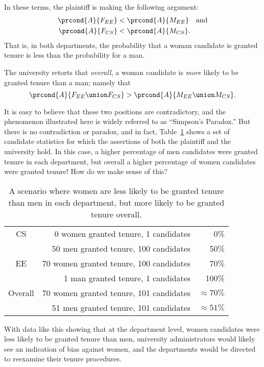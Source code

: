 In these terms, the plaintiff is making the following argument:
%
\begin{align*}
\prcond{A}{F_{EE}} & < \prcond{A}{M_{EE}} \quad\text{and}\\
\prcond{A}{F_{CS}} & < \prcond{A}{M_{CS}}.
\end{align*}
That is, in both departments, the probability that a woman candidate
is granted tenure is less than the probability for a man.

The university retorts that \emph{overall}, a woman candidate is
\emph{more} likely to be granted tenure than a man; namely that
\[
    \prcond{A}{F_{EE} \union F_{CS}} > \prcond{A}{M_{EE} \union M_{CS}}.
\]

It is easy to believe that these two positions are contradictory, and
the phenomenon illustrated here is widely referred to as ``Simpson's
Paradox.''  But there is no contradiction or paradox, and in fact,
Table~\ref{fig:15D3} shows a set of candidate statistics for which the
assertions of both the plaintiff and the university hold.  In this
case, a higher percentage of men candidates were granted tenure in
each department, but overall a higher percentage of women candidates
were granted tenure!  How do we make sense of this?

\begin{table}

\begin{tabular}{crr}
CS & 0 women granted tenure, 1 candidates      &   0\% \\
   & 50 men granted tenure, 100 candidates     &  50\% \\
EE & 70 women granted tenure, 100 candidates   &  70\% \\
   & 1 man granted tenure, 1 candidates         & 100\% \\
\hline
Overall & 70 women granted tenure, 101 candidates & $\approx 70\%$ \\
        & 51 men granted tenure, 101 candidates   & $\approx 51\%$
\end{tabular}

\caption{A scenario where women are less likely to be granted tenure
  than men in each department, but more likely to be granted tenure
  overall.}

\label{fig:15D3}

\end{table}

With data like this showing that at the department level, women
candidates were less likely to be granted tenure than men, university
administrators would likely see an indication of bias against women,
and the departments would be directed to reexamine their tenure
procedures.

